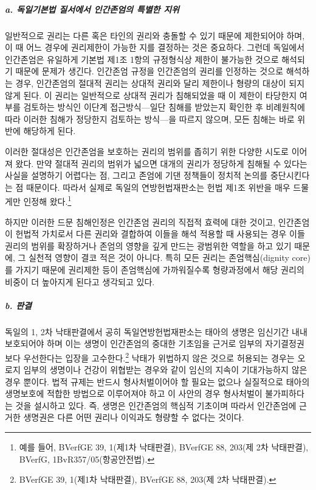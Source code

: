 \subparagraph{\texorpdfstring{a. 독일기본법 질서에서 인간존엄의 특별한 지위 }{a. 독일기본법 질서에서 인간존엄의 특별한 지위 }}

일반적으로 권리는 다른 혹은 타인의 권리와 충돌할 수 있기 때문에 제한되어야 하며, 이 때 어느 경우에 권리제한이 가능한 지를 결정하는 것은 중요하다. 그런데 독일에서 인간존엄은 유일하게 기본법 제1조 1항의 규정형식상 제한이 불가능한 것으로 해석되기 때문에 문제가 생긴다. 인간존엄 규정을 인간존엄의 권리를 인정하는 것으로 해석하는 경우, 인간존엄의 절대적 권리는 상대적 권리와 달리 제한이나 형량의 대상이 되지 않게 된다. 이 권리는 일반적으로 상대적 권리가 침해되었을 때 이 제한이 타당한지 여부를 검토하는 방식인 이단계 접근방식---일단 침해를 받았는지 확인한 후 비례원칙에 따라 이러한 침해가 정당한지 검토하는 방식---을 따르지 않으며, 모든 침해는 바로 위반에 해당하게 된다.

이러한 절대성은 인간존엄을 보호하는 권리의 범위를 좁히기 위한 다양한 시도로 이어져 왔다. 만약 절대적 권리의 범위가 넓으면 대개의 권리가 정당하게 침해될 수 있다는 사실을 설명하기 어렵다는 점, 그리고 존엄에 기댄 정책들이 정치적 논의를 중단시킨다는 점 때문이다. 따라서 실제로 독일의 연방헌법재판소는 헌법 제1조 위반을 매우 드물게만 인정해 왔다.\footnote{예를 들어, BVerfGE 39, 1(제1차 낙태판결), BVerfGE 88, 203(제 2차 낙태판결), BVerfG, 1BvR357/05(항공안전법).}

하지만 이러한 드문 침해인정은 인간존엄 권리의 직접적 효력에 대한 것이고, 인간존엄이 헌법적 가치로서 다른 권리와 결합하여 이들을 해석 적용할 때 사용되는 경우 이들 권리의 범위를 확장하거나 존엄의 영향을 깊게 만드는 광범위한 역할을 하고 있기 때문에, 그 실천적 영향이 결코 적은 것이 아니다. 특히 모든 권리는 존엄핵심(dignity core)를 가지기 때문에 권리제한 등이 존엄핵심에 가까워질수록 형량과정에서 해당 권리의 비중이 더 높아지게 된다고 생각되고 있다.

\subparagraph{\texorpdfstring{b. 판결 }{b. 판결 }}

독일의 1, 2차 낙태판결에서 공히 독일연방헌법재판소는 태아의 생명은 임신기간 내내 보호되어야 하며 이는 생명이 인간존엄의 중대한 기초임을 근거로 임부의 자기결정권보다 우선한다는 입장을 고수한다.\footnote{BVerfGE 39, 1(제1차 낙태판결), BVerfGE 88, 203(제 2차 낙태판결).} 낙태가 위법하지 않은 것으로 허용되는 경우는 오로지 임부의 생명이나 건강이 위협받는 경우와 같이 임신의 지속이 기대가능하지 않은 경우 뿐이다. 법적 규제는 반드시 형사처벌이어야 할 필요는 없으나 실질적으로 태아의 생명보호에 적합한 방법으로 이루어져야 하고 이 사안의 경우 형사처벌이 불가피하다는 것을 설시하고 있다. 즉, 생명은 인간존엄의 핵심적 기초이며 따라서 인간존엄에 근거한 생명권은 다른 어떤 권리나 이익과도 형량할 수 없다는 것이다.

